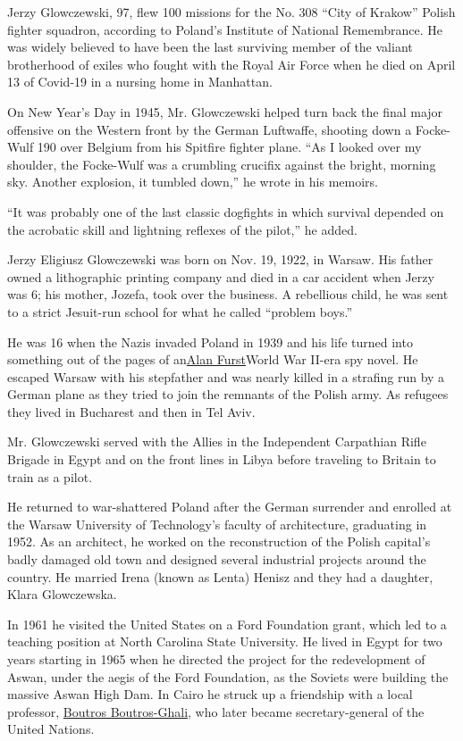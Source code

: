 Jerzy Glowczewski, 97, flew 100 missions for the No. 308 ``City of
Krakow'' Polish fighter squadron, according to Poland's Institute of
National Remembrance. He was widely believed to have been the last
surviving member of the valiant brotherhood of exiles who fought with
the Royal Air Force when he died on April 13 of Covid-19 in a nursing
home in Manhattan.

On New Year's Day in 1945, Mr. Glowczewski helped turn back the final
major offensive on the Western front by the German Luftwaffe, shooting
down a Focke-Wulf 190 over Belgium from his Spitfire fighter plane. ``As
I looked over my shoulder, the Focke-Wulf was a crumbling crucifix
against the bright, morning sky. Another explosion, it tumbled down,''
he wrote in his memoirs.

``It was probably one of the last classic dogfights in which survival
depended on the acrobatic skill and lightning reflexes of the pilot,''
he added.

Jerzy Eligiusz Glowczewski was born on Nov. 19, 1922, in Warsaw. His
father owned a lithographic printing company and died in a car accident
when Jerzy was 6; his mother, Jozefa, took over the business. A
rebellious child, he was sent to a strict Jesuit-run school for what he
called ``problem boys.''

He was 16 when the Nazis invaded Poland in 1939 and his life turned into
something out of the pages of
an\href{https://www.nytimes.com/2016/06/05/books/review/alan-fursts-a-hero-of-france.html}{Alan
Furst}World War II-era spy novel. He escaped Warsaw with his stepfather
and was nearly killed in a strafing run by a German plane as they tried
to join the remnants of the Polish army. As refugees they lived in
Bucharest and then in Tel Aviv.

Mr. Glowczewski served with the Allies in the Independent Carpathian
Rifle Brigade in Egypt and on the front lines in Libya before traveling
to Britain to train as a pilot.

He returned to war-shattered Poland after the German surrender and
enrolled at the Warsaw University of Technology's faculty of
architecture, graduating in 1952. As an architect, he worked on the
reconstruction of the Polish capital's badly damaged old town and
designed several industrial projects around the country. He married
Irena (known as Lenta) Henisz and they had a daughter, Klara
Glowczewska.

In 1961 he visited the United States on a Ford Foundation grant, which
led to a teaching position at North Carolina State University. He lived
in Egypt for two years starting in 1965 when he directed the project for
the redevelopment of Aswan, under the aegis of the Ford Foundation, as
the Soviets were building the massive Aswan High Dam. In Cairo he struck
up a friendship with a local professor,
\href{https://www.nytimes.com/2016/02/17/world/boutros-boutros-ghali-death.html}{Boutros
Boutros-Ghali}, who later became secretary-general of the United
Nations.

